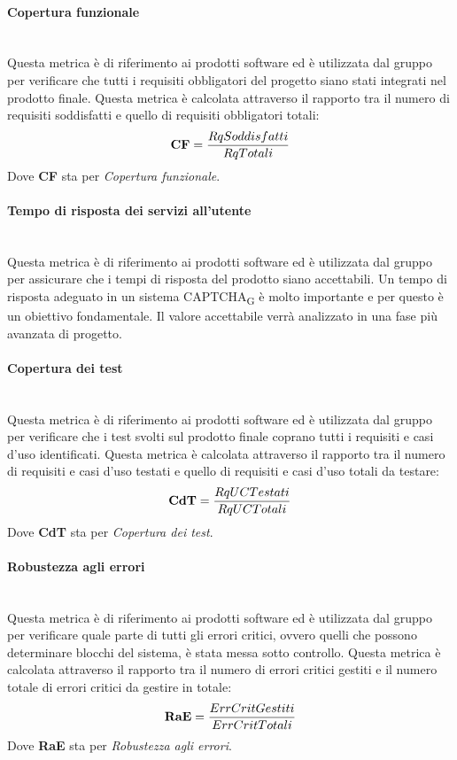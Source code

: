 \paragraph{Copertura funzionale}\mbox{}\\
Questa metrica è di riferimento ai prodotti software ed è utilizzata dal gruppo per verificare che tutti i requisiti obbligatori del progetto siano stati integrati nel prodotto finale. Questa metrica è calcolata attraverso il rapporto tra il numero di requisiti soddisfatti e quello di requisiti obbligatori totali:
\begin{align*}
	\centering
	\textbf{CF} = \frac{RqSoddisfatti}{RqTotali}
\end{align*}
Dove \textbf{CF} sta per \textit{Copertura funzionale}.
\paragraph{Tempo di risposta dei servizi all'utente}\mbox{}\\
Questa metrica è di riferimento ai prodotti software ed è utilizzata dal gruppo per assicurare che i tempi di risposta del prodotto siano accettabili. Un tempo di risposta adeguato in un sistema CAPTCHA\textsubscript{G} è molto importante e per questo è un obiettivo fondamentale. Il valore accettabile verrà analizzato in una fase più avanzata di progetto.
\paragraph{Copertura dei test}\mbox{}\\
Questa metrica è di riferimento ai prodotti software ed è utilizzata dal gruppo per verificare che i test svolti sul prodotto finale coprano tutti i requisiti e casi d’uso identificati. Questa metrica è calcolata attraverso il rapporto tra il numero di requisiti e casi d'uso testati e quello di requisiti e casi d'uso totali da testare:
\begin{align*}
	\centering
	\textbf{CdT} = \frac{RqUCTestati}{RqUCTotali}
\end{align*}
Dove \textbf{CdT} sta per \textit{Copertura dei test}.
\paragraph{Robustezza agli errori}\mbox{}\\
Questa metrica è di riferimento ai prodotti software ed è utilizzata dal gruppo per verificare quale parte di tutti gli errori critici, ovvero quelli che possono determinare blocchi del sistema, è stata messa sotto controllo. Questa metrica è calcolata attraverso il rapporto tra il numero di errori critici gestiti e il numero totale di errori critici da gestire in totale:
\begin{align*}
	\centering
	\textbf{RaE} = \frac{ErrCritGestiti}{ErrCritTotali}
\end{align*}
Dove \textbf{RaE} sta per \textit{Robustezza agli errori}.
